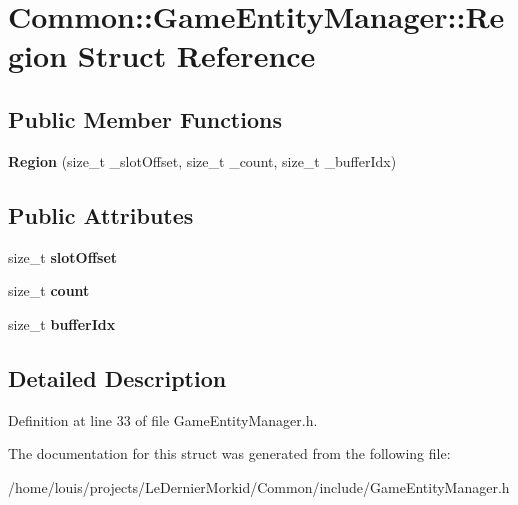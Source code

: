 \hypertarget{struct_common_1_1_game_entity_manager_1_1_region}{}\section{Common\+:\+:Game\+Entity\+Manager\+:\+:Region Struct Reference}
\label{struct_common_1_1_game_entity_manager_1_1_region}
\subsection*{Public Member Functions}
\begin{DoxyCompactItemize}
\item 
\mbox{\label{struct_common_1_1_game_entity_manager_1_1_region_a512d36c1d139426777c12a99610ab355}} 
{\bfseries Region} (size\+\_\+t \+\_\+slot\+Offset, size\+\_\+t \+\_\+count, size\+\_\+t \+\_\+buffer\+Idx)
\end{DoxyCompactItemize}
\subsection*{Public Attributes}
\begin{DoxyCompactItemize}
\item 
\mbox{\label{struct_common_1_1_game_entity_manager_1_1_region_aee632a69b930123c89fdd4033ac603f9}} 
size\+\_\+t {\bfseries slot\+Offset}
\item 
\mbox{\label{struct_common_1_1_game_entity_manager_1_1_region_ae9244a3cdea9f921216a60e90b775f00}} 
size\+\_\+t {\bfseries count}
\item 
\mbox{\label{struct_common_1_1_game_entity_manager_1_1_region_a8c4c8b0b4ad2688a625a00fcd290e512}} 
size\+\_\+t {\bfseries buffer\+Idx}
\end{DoxyCompactItemize}


\subsection{Detailed Description}


Definition at line 33 of file Game\+Entity\+Manager.\+h.



The documentation for this struct was generated from the following file\+:\begin{DoxyCompactItemize}
\item 
/home/louis/projects/\+Le\+Dernier\+Morkid/\+Common/include/Game\+Entity\+Manager.\+h\end{DoxyCompactItemize}
